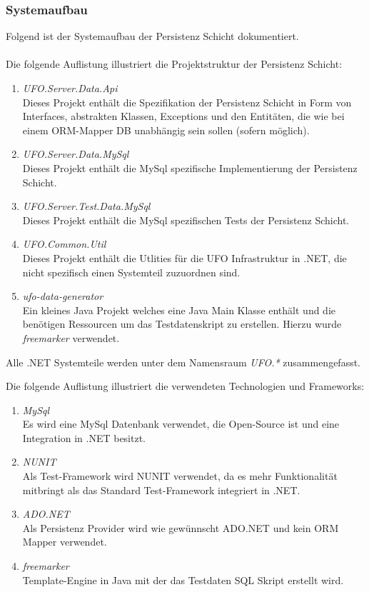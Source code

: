 \documentclass[11pt, a4paper, twoside]{article}   	%
\begin{document}
\subsubsection{Systemaufbau}
Folgend ist der Systemaufbau der Persistenz Schicht dokumentiert.\\\\
Die folgende Auflistung illustriert die Projektstruktur der Persistenz Schicht:
\begin{enumerate}
	\item\emph{UFO.Server.Data.Api}\\
	 Dieses Projekt enthält die Spezifikation der Persistenz Schicht in Form von 	      Interfaces, abstrakten Klassen, Exceptions und den Entitäten, die wie bei einem ORM-Mapper DB unabhängig sein sollen (sofern möglich).
	 \item\emph{UFO.Server.Data.MySql}\\
	 Dieses Projekt enthält die MySql spezifische Implementierung der Persistenz Schicht.
	 \item\emph{UFO.Server.Test.Data.MySql}\\
	 Dieses Projekt enthält die MySql spezifischen Tests der Persistenz Schicht.
	 \item\emph{UFO.Common.Util}\\
	 Dieses Projekt enthält die Utlities für die UFO Infrastruktur in .NET, die nicht spezifisch einen Systemteil zuzuordnen sind.
	 \item\emph{ufo-data-generator}\\
	 Ein kleines Java Projekt welches eine Java Main Klasse enthält und die benötigen Ressourcen um das Testdatenskript zu erstellen. Hierzu wurde \emph{freemarker} verwendet.
\end{enumerate}
Alle .NET Systemteile werden unter dem Namensraum \emph{UFO.*} zusammengefasst.

\newpage
Die folgende Auflistung illustriert die verwendeten Technologien und Frameworks:
\begin{enumerate}
	\item\emph{MySql}\\
	Es wird eine MySql Datenbank verwendet, die Open-Source ist und eine Integration in .NET besitzt.
	\item\emph{NUNIT}\\
	Als Test-Framework wird NUNIT verwendet, da es mehr Funktionalität mitbringt als das Standard Test-Framework integriert in .NET.
	\item\emph{ADO.NET}\\
	Als Persistenz Provider wird wie gewünnscht ADO.NET und kein ORM Mapper verwendet.
	\item\emph{freemarker}\\
	Template-Engine in Java mit der das Testdaten SQL Skript erstellt wird.
\end{enumerate}
\end{document}
